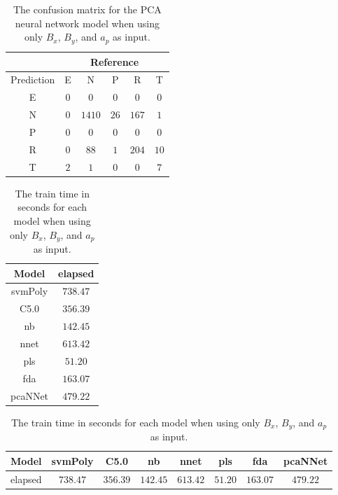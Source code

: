 \begin{table}[!ht]
	\centering
	\begin{tabular}{|c|c|c|c|c|c|}
		\hline
		 & \multicolumn{5}{|c|}{Reference} \\ \hline
		 Prediction & E & N & P & R & T \\ \hline
		 E & $0$ & $0$ & $0$ & $0$ & $0$ \\ \hline
		 N & $0$ & $1410$ & $26$ & $167$ & $1$ \\ \hline
		 P & $0$ & $0$ & $0$ & $0$ & $0$ \\ \hline
		 R & $0$ & $88$ & $1$ & $204$ & $10$ \\ \hline
		 T & $2$ & $1$ & $0$ & $0$ & $7$ \\ \hline
	\end{tabular}
	\caption{The confusion matrix for the PCA neural network model when using only $B_{x}$, $B_{y}$, and $a_{p}$ as input.}
	\label{tab:cm:xyap:pcaNNet}
\end{table}

\begin{table}[!ht]
	\centering
	\begin{tabular}{|c|c|}
		\hline
		Model & elapsed \\ \hline
		svmPoly & $738.47$ \\ \hline
		C5.0 & $356.39$ \\ \hline
		nb & $142.45$ \\ \hline
		nnet & $613.42$ \\ \hline
		pls & $51.20$ \\ \hline
		fda & $163.07$ \\ \hline
		pcaNNet & $479.22$ \\ \hline
	\end{tabular}
	\caption{The train time in seconds for each model when using only $B_{x}$, $B_{y}$, and $a_{p}$ as input.}
	\label{tab:time:xyap:train}
\end{table}

\begin{table}[!ht]
	\centering
	\begin{tabular}{|c|c|c|c|c|c|c|c|}
		\hline
		Model & svmPoly & C5.0 & nb & nnet & pls & fda & pcaNNet \\ \hline
		elapsed & $738.47$ & $356.39$ & $142.45$ & $613.42$ & $51.20$ & $163.07$ & $479.22$ \\ \hline
	\end{tabular}
	\caption{The train time in seconds for each model when using only $B_{x}$, $B_{y}$, and $a_{p}$ as input.}
	\label{tab:time:reverse:xyap:train}
\end{table}

